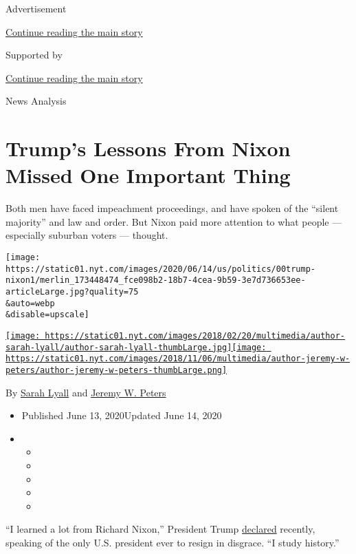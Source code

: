 Advertisement

\protect\hyperlink{after-top}{Continue reading the main story}

Supported by

\protect\hyperlink{after-sponsor}{Continue reading the main story}

News Analysis

\hypertarget{trumps-lessons-from-nixon-missed-one-important-thing}{%
\section{Trump's Lessons From Nixon Missed One Important
Thing}\label{trumps-lessons-from-nixon-missed-one-important-thing}}

Both men have faced impeachment proceedings, and have spoken of the
``silent majority'' and law and order. But Nixon paid more attention to
what people --- especially suburban voters --- thought.

\texttt{[image: https://static01.nyt.com/images/2020/06/14/us/politics/00trump-nixon1/merlin\_173448474\_fce098b2-18b7-4cea-9b59-3e7d736653ee-articleLarge.jpg?quality=75\\\&auto=webp\\\&disable=upscale]}

\href{https://www.nytimes.com/by/sarah-lyall}{\texttt{[image: https://static01.nyt.com/images/2018/02/20/multimedia/author-sarah-lyall/author-sarah-lyall-thumbLarge.jpg]}}\href{https://www.nytimes.com/by/jeremy-w-peters}{\texttt{[image: https://static01.nyt.com/images/2018/11/06/multimedia/author-jeremy-w-peters/author-jeremy-w-peters-thumbLarge.png]}}

By \href{https://www.nytimes.com/by/sarah-lyall}{Sarah Lyall} and
\href{https://www.nytimes.com/by/jeremy-w-peters}{Jeremy W. Peters}

\begin{itemize}
\item
  Published June 13, 2020Updated June 14, 2020
\item
  \begin{itemize}
  \item
  \item
  \item
  \item
  \item
  \end{itemize}
\end{itemize}

``I learned a lot from Richard Nixon,'' President Trump
\href{https://thehill.com/homenews/administration/496758-trump-says-he-learned-a-lot-from-nixon-dont-fire-people}{declared}
recently, speaking of the only U.S. president ever to resign in
disgrace. ``I study history.''

